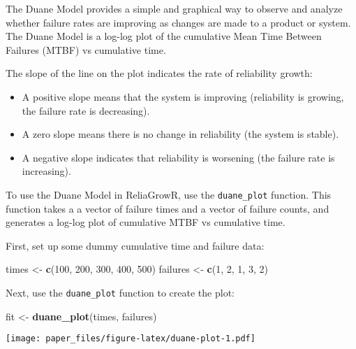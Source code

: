 \documentclass[
]{article}
\newenvironment{Shaded}{\begin{snugshade}}{\end{snugshade}}
\newcommand{\DecValTok}[1]{\textcolor[rgb]{0.00,0.00,0.81}{#1}}
\newcommand{\FunctionTok}[1]{\textcolor[rgb]{0.13,0.29,0.53}{\textbf{#1}}}
\newcommand{\NormalTok}[1]{#1}
\newcommand{\OtherTok}[1]{\textcolor[rgb]{0.56,0.35,0.01}{#1}}
\providecommand{\tightlist}{%
  \setlength{\itemsep}{0pt}\setlength{\parskip}{0pt}}
\begin{document}
The Duane Model provides a simple and graphical way to observe and
analyze whether failure rates are improving as changes are made to a
product or system. The Duane Model is a log-log plot of the cumulative
Mean Time Between Failures (MTBF) vs cumulative time.

The slope of the line on the plot indicates the rate of reliability
growth:

\begin{itemize}
\tightlist
\item
  A positive slope means that the system is improving (reliability is
  growing, the failure rate is decreasing).
\item
  A zero slope means there is no change in reliability (the system is
  stable).
\item
  A negative slope indicates that reliability is worsening (the failure
  rate is increasing).
\end{itemize}

To use the Duane Model in ReliaGrowR, use the \texttt{duane\_plot}
function. This function takes a a vector of failure times and a vector
of failure counts, and generates a log-log plot of cumulative MTBF vs
cumulative time.

First, set up some dummy cumulative time and failure data:

\begin{Shaded}
\begin{Highlighting}[]
\NormalTok{times }\OtherTok{\textless{}{-}} \FunctionTok{c}\NormalTok{(}\DecValTok{100}\NormalTok{, }\DecValTok{200}\NormalTok{, }\DecValTok{300}\NormalTok{, }\DecValTok{400}\NormalTok{, }\DecValTok{500}\NormalTok{)}
\NormalTok{failures }\OtherTok{\textless{}{-}} \FunctionTok{c}\NormalTok{(}\DecValTok{1}\NormalTok{, }\DecValTok{2}\NormalTok{, }\DecValTok{1}\NormalTok{, }\DecValTok{3}\NormalTok{, }\DecValTok{2}\NormalTok{)}
\end{Highlighting}
\end{Shaded}

Next, use the \texttt{duane\_plot} function to create the plot:

\begin{Shaded}
\begin{Highlighting}[]
\NormalTok{fit }\OtherTok{\textless{}{-}} \FunctionTok{duane\_plot}\NormalTok{(times, failures)}
\end{Highlighting}
\end{Shaded}

\texttt{[image: paper\_files/figure-latex/duane-plot-1.pdf]}
\end{document}
